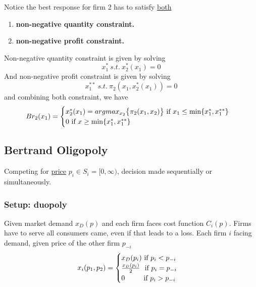 \documentclass[]{article}
\begin{document}
                \begin{remark}
                    Notice the best response for firm 2 has to satisfy \ul{both} 
                    \begin{enumerate}
                        \item \textbf{non-negative quantity constraint.}
                        \item \textbf{non-negative profit constraint.}
                    \end{enumerate}
                    Non-negative quantity constraint is given by solving 
                    \[
                        x_{1}^*\ s.t.\ x_2^*(x_1) = 0
                    \]
                    And non-negative profit constraint is given by solving
                    \[
                        x_{1}^{**}\ s.t.\ \pi_2(x_1, x_2^*(x_1)) = 0 
                    \]
                    and combining both constraint, we have 
                    \[
                        Br_2(x_1) = 
                        \begin{cases}
                            x_2^*(x_1) = argmax_{x_2} \big \{ \pi_2(x_1,x_2) \big \} \text{{ if }} x_1 \leq \min\{x_1^*, x_1^{**}\} \\
                            0 \text{{ if }} x \geq \min\{x_1^*, x_1^{**}\} \\
                        \end{cases}
                    \]
                \end{remark}
            
        \subsection{Bertrand Oligopoly}
            \par Competing for \ul{price} $p_i \in S_i = [0, \infty)$, decision made sequentially or simultaneously.
            \subsubsection{Setup: duopoly}
                \par Given market demand $x_D(p)$ and each firm faces cost function $C_i(p)$. Firms have to serve all consumers came, even if that leads to a loss. Each firm $i$ facing demand, given price of the other firm $p_{-i}$
                \[
                x_i(p_1, p_2) = 
                    \begin{cases}
                        x_D(p_i) \text{{ if }} p_i < p_{-i} \\
                        \frac{x_D(p_i)}{2}\ \text{{ if }} p_i = p_{-i} \\
                        0 \quad \quad \ \text{{ if }} p_i > p_{-i} \\
                    \end{cases}
                \]
                
\end{document}
